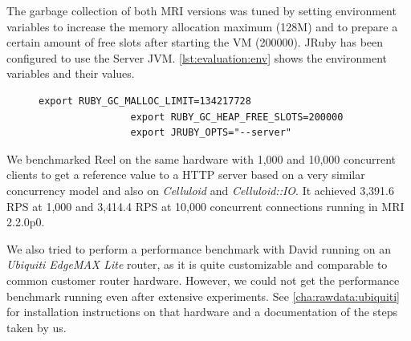 		The garbage collection of both \ac{MRI} versions was tuned by setting
		environment variables to increase the memory allocation maximum (128M)
		and to prepare a certain amount of free slots after starting the
		\ac{VM} (200000). JRuby has been configured to use the Server \ac{JVM}.
		\autoref{lst:evaluation:env} shows the environment variables and their
		values.

		\begin{figure}
			\begin{lstlisting}[gobble=8,caption={Performance benchmark environment variables},label=lst:evaluation:env]
				export RUBY_GC_MALLOC_LIMIT=134217728
				export RUBY_GC_HEAP_FREE_SLOTS=200000
				export JRUBY_OPTS="--server"
			\end{lstlisting}
		\end{figure}

		We benchmarked Reel \cite{reel} on the same hardware with 1,000 and
		10,000 concurrent clients to get a reference value to a \ac{HTTP}
		server based on a very similar concurrency model and also on
		\emph{Celluloid} and \emph{Celluloid::IO}. It achieved 3,391.6 \ac{RPS}
		at 1,000 and 3,414.4 \ac{RPS} at 10,000 concurrent connections running
		in \ac{MRI} 2.2.0p0.

		We also tried to perform a performance benchmark with David running on
		an \emph{Ubiquiti EdgeMAX Lite} router, as it is quite customizable and
		comparable to common customer router hardware. However, we could not
		get the performance benchmark running even after extensive experiments.
		See \autoref{cha:rawdata:ubiquiti} for installation instructions on
		that hardware and a documentation of the steps taken by us.

